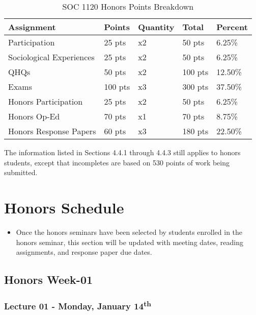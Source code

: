 \documentclass[]{book}
\newenvironment{rmdblock}[1]
  {\begin{shaded*}
  \begin{itemize}
  \renewcommand{\labelitemi}{
    \raisebox{-.7\height}[0pt][0pt]{
      {\setkeys{Gin}{width=3em,keepaspectratio}\texttt{[image: images/\#1]}}
    }
  }
  \item
  }
  {
  \end{itemize}
  \end{shaded*}
  }
\newenvironment{rmdwarning}
  {\begin{rmdblock}{warning}}
  {\end{rmdblock}}
\begin{document}
\begin{table}[t]

\caption{\label{tab:unnamed-chunk-5}SOC 1120 Honors Points Breakdown}
\centering
\begin{tabular}{lllll}
\toprule
Assignment & Points & Quantity & Total & Percent\\
\midrule
Participation & 25 pts & x2 & 50 pts & 6.25\%\\
Sociological Experiences & 25 pts & x2 & 50 pts & 6.25\%\\
QHQs & 50 pts & x2 & 100 pts & 12.50\%\\
Exams & 100 pts & x3 & 300 pts & 37.50\%\\
Honors Participation & 25 pts & x2 & 50 pts & 6.25\%\\
\addlinespace
Honors Op-Ed & 70 pts & x1 & 70 pts & 8.75\%\\
Honors Response Papers & 60 pts & x3 & 180 pts & 22.50\%\\
\bottomrule
\end{tabular}
\end{table}

The information listed in Sections 4.4.1 through 4.4.3 still applies to honors students, except that incompletes are based on 530 points of work being submitted.

\hypertarget{honors-schedule}{%
\chapter{Honors Schedule}\label{honors-schedule}}

\begin{rmdwarning}
Once the honors seminars have been selected by students enrolled in the
honors seminar, this section will be updated with meeting dates, reading
assignments, and response paper due dates.
\end{rmdwarning}

\hypertarget{honors-week-01}{%
\section*{Honors Week-01}\label{honors-week-01}}

\hypertarget{lecture-01---monday-january-14th-1}{%
\subsection*{\texorpdfstring{Lecture 01 - Monday, January 14\textsuperscript{th}}{Lecture 01 - Monday, January 14th}}\label{lecture-01---monday-january-14th-1}}
\end{document}
